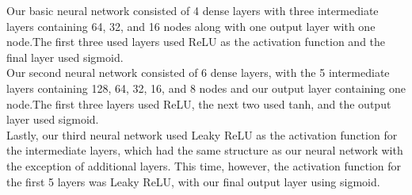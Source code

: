 Our basic neural network consisted of 4 dense layers with three intermediate layers containing 64, 32, and 16 nodes along with one output layer with one node.\hspace{1pt}The first three used layers used ReLU as the activation function and the final layer used sigmoid.\\

Our second neural network consisted of 6 dense layers, with the 5 intermediate layers containing 128, 64, 32, 16, and 8 nodes and our output layer containing one node.\hspace{1pt}The first three layers used ReLU, the next two used tanh, and the output layer used sigmoid.\\

Lastly, our third neural network used Leaky ReLU as the activation function for the intermediate layers, which had the same structure as our neural network with the exception of additional layers. This time, however, the activation function for the first 5 layers was Leaky ReLU, with our final output layer using sigmoid. 
